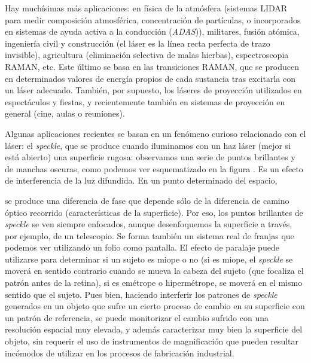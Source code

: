 \documentclass[12pt,a4paper]{report}
\newcommand{\esp}{\vspace{0.5cm}}
\begin{document}
	\esp
	
	Hay muchísimas más aplicaciones: en física de la atmósfera (sistemas LIDAR para medir composición atmosférica, concentración de partículas, o incorporados en sistemas de ayuda activa a la conducción (\textit{ADAS})), militares, fusión atómica, ingeniería civil y construcción (el láser es la línea recta perfecta de trazo invisible), agricultura (eliminación selectiva de malas hierbas), espectroscopia RAMAN, etc. Este último se basa en las transiciones RAMAN, que se producen en determinados valores de energía propios de cada sustancia tras excitarla con un láser adecuado. También, por supuesto, los láseres de proyección utilizados en espectáculos y fiestas, y recientemente también en sistemas de proyección en general (cine, aulas o reuniones).
	
	\esp
	Algunas aplicaciones recientes se basan en un fenómeno curioso relacionado con el láser: el \textit{speckle}, que se produce cuando iluminamos con un haz láser (mejor si está abierto) una superficie rugosa: observamos una serie de puntos brillantes y de manchas oscuras, como podemos ver esquematizado en la figura . Es un efecto de interferencia de la luz difundida. En un punto determinado del espacio,
	
	\esp
	se produce una diferencia de fase que depende sólo de la diferencia de camino óptico recorrido (características de la superficie). Por eso, los puntos brillantes de \textit{speckle} se ven siempre enfocados, aunque desenfoquemos la superficie a través, por ejemplo, de un telescopio. Se forma también un sistema real de franjas que podemos ver utilizando un folio como pantalla. El efecto de paralaje puede utilizarse para determinar si un sujeto es miope o no (si es miope, el \textit{speckle} se moverá en sentido contrario cuando se mueva la cabeza del sujeto (que focaliza el patrón antes de la retina), si es emétrope o hipermétrope, se moverá en el mismo sentido que el sujeto. Pues bien, haciendo interferir los patrones de \textit{speckle} generados en un objeto que sufre un cierto proceso de cambio en su superficie con un patrón de referencia, se puede monitorizar el cambio sufrido con una resolución espacial muy elevada, y además caracterizar muy bien la superficie del objeto, sin requerir el uso de instrumentos de magnificación que pueden resultar incómodos de utilizar en los procesos de fabricación industrial.
	
	\printbibliography[title={Bibliografía}]
\end{document}
